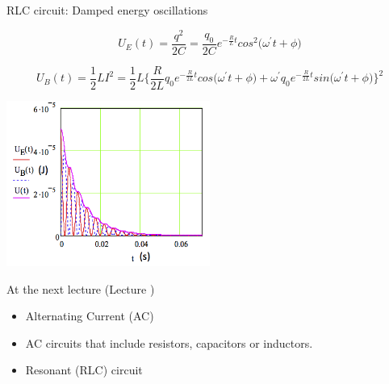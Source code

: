 \begin{frame}{RLC circuit: Damped energy oscillations}

\begin{equation*}
  U_E(t) = \frac{q^2}{2C} = \frac{q_0}{2C} e^{-\frac{R}{L}t} cos^{2}\Big(\omega^{\prime} t + \phi \Big)
\end{equation*}

\begin{equation*}
  U_B(t) = \frac{1}{2}LI^2 = \frac{1}{2}L
                 \Big\{
                     \frac{R}{2L} q_0 e^{-\frac{R}{2L}t} cos\Big(\omega^{\prime} t + \phi \Big) +
                     \omega^{\prime} q_0 e^{-\frac{R}{2L}t} sin\Big(\omega^{\prime} t + \phi \Big)
                  \Big\}^2
\end{equation*}

\begin{center}
     \includegraphics[width=0.50\textwidth]{./images/misc/UtRLC.png}\\
\end{center}

\end{frame}



%
%

\renewcommand{\lecturesummarytitle}{Main points to remember }


%
%

\begin{frame}{At the next lecture (Lecture \nextlecture)}

\begin{itemize}
   \item Alternating Current (AC)
   \item AC circuits that include resistors, capacitors or inductors.
   \item Resonant (RLC) circuit
\end{itemize}

\end{frame}


